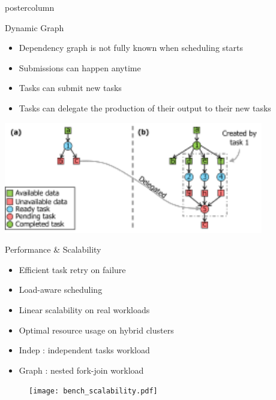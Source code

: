 \begin{frame}[fragile]
\begin{columns}[T]
\begin{column}{.49\textwidth}
\begin{beamercolorbox}[center,wd=\textwidth]{postercolumn}
\begin{minipage}[T]{.96\textwidth}

            \begin{block}{Dynamic Graph}
            \begin{itemize}
                \item Dependency graph is not fully known when scheduling starts
                \item Submissions can happen anytime
                \item Tasks can submit new tasks
                \item Tasks can delegate the production of their output to their new tasks
            \end{itemize}
            \centering
            \vspace{1cm}
            \vfill
            \includegraphics[width=0.85\textwidth]{subtasking.pdf}
            \end{block}

            \begin{block}{Performance \& Scalability}
            \begin{itemize}
                \item Efficient task retry on failure
                \item Load-aware scheduling
                \item Linear scalability on real workloads
                \item Optimal resource usage on hybrid clusters
                \item Indep : independent tasks workload
                \item Graph : nested fork-join workload
            \end{itemize}
            \begin{figure}
              \centering
              \texttt{[image: bench\_scalability.pdf]}
            \end{figure}
            \end{block}


\end{minipage}
\end{beamercolorbox}
\end{column}
\end{columns}
\end{frame}

